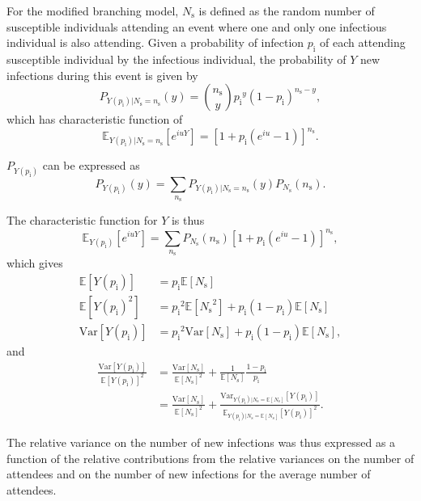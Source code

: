 \documentclass[sr]{drdc-report}
\newcommand{\pinf}{\ensuremath{{p_\mathrm{i}}}}
\newcommand{\Ns}{\ensuremath{{N_\mathrm{s}}}}
\newcommand{\ns}{\ensuremath{{n_\mathrm{s}}}}
\newcommand{\ex}[1]{\mathbb{E}\left[#1\right]}
\newcommand{\exon}[2]{\mathbb{E}_{#1}\left[#2\right]}
\newcommand{\var}[1]{\mathrm{Var}\left[#1\right]}
\newcommand{\varon}[2]{\mathrm{Var}_{#1}\left[#2\right]}
\begin{document}
For the modified branching model, $\Ns$ is defined as the random number of susceptible individuals attending an event where one and only one infectious individual is also attending.
Given a probability of infection $\pinf$ of each attending susceptible individual by the infectious individual, the probability of $Y$ new infections during this event is given by
\begin{equation}
P_{Y(\pinf)|\Ns=\ns}(y)={\ns\choose y}\pinf^y(1-\pinf)^{\ns-y},
\end{equation}
which has characteristic function of
\begin{equation}
\exon{Y(\pinf)|\Ns=\ns}{e^{iuY}}=\left[1+\pinf(e^{iu}-1)\right]^\ns.
\end{equation}

$P_{Y(\pinf)}$ can be expressed as
\begin{equation}
P_{Y(\pinf)}(y)=\sum_{\ns}P_{Y(\pinf)|\Ns=\ns}(y)P_\Ns(\ns).
\end{equation}

The characteristic function for $Y$ is thus
\begin{equation}
\exon{Y(\pinf)}{e^{iuY}}=\sum_\ns P_\Ns(\ns)\left[1+\pinf(e^{iu}-1)\right]^\ns,
\end{equation}
which gives
\begin{align}
\ex{Y(\pinf)} &= \pinf\ex{\Ns}\\
\ex{Y(\pinf)^2} &= \pinf^2\ex{\Ns^2}+\pinf(1-\pinf)\ex{\Ns}\\
\var{Y(\pinf)} &= \pinf^2\var{\Ns}+\pinf(1-\pinf)\ex{\Ns},
\end{align}
and
\begin{align}
\frac{\var{Y(\pinf)}}{\ex{Y(\pinf)}^2} & = \frac{\var{\Ns}}{\ex{\Ns}^2}+\frac{1}{\ex{\Ns}}\frac{1-\pinf}{\pinf}\\
& = \frac{\var{\Ns}}{\ex{\Ns}^2}+\frac{\varon{Y(\pinf)|\Ns=\ex{\Ns}}{Y(\pinf)}}{\exon{Y(\pinf)|\Ns=\ex{\Ns}}{Y(\pinf)}^2}.
\end{align}

The relative variance on the number of new infections was thus expressed as a function of the relative contributions from the relative variances on the number of attendees and on the number of new infections for the average number of attendees.
\end{document}
